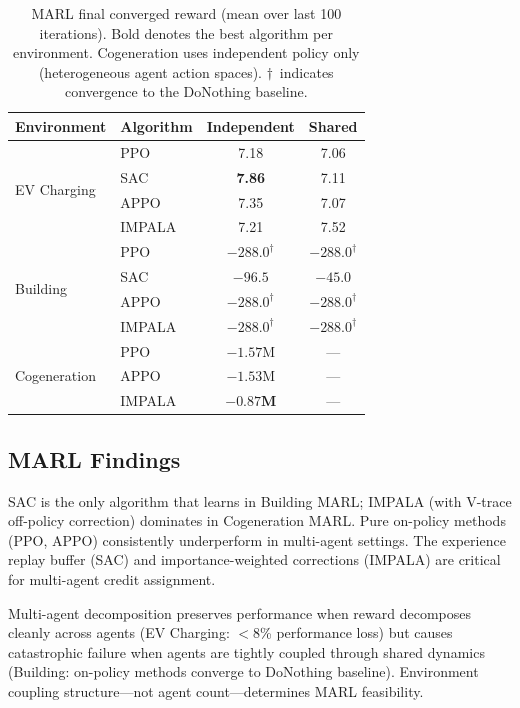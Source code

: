 \begin{table}[htbp]
\centering
\caption{MARL final converged reward (mean over last 100 iterations). Bold denotes the best algorithm per environment. Cogeneration uses independent policy only (heterogeneous agent action spaces). $\dagger$~indicates convergence to the DoNothing baseline.}
\label{tab:marl_summary}
\small
\begin{tabular}{llcc}
\toprule
\textbf{Environment} & \textbf{Algorithm} & \textbf{Independent} & \textbf{Shared} \\
\midrule
\multirow{4}{*}{EV Charging}
    & PPO    & 7.18  & 7.06 \\
    & SAC    & \textbf{7.86}  & 7.11 \\
    & APPO   & 7.35  & 7.07 \\
    & IMPALA & 7.21  & 7.52 \\
\midrule
\multirow{4}{*}{Building}
    & PPO    & $-288.0^\dagger$ & $-288.0^\dagger$ \\
    & SAC    & $-96.5$ & $\mathbf{-45.0}$ \\
    & APPO   & $-288.0^\dagger$ & $-288.0^\dagger$ \\
    & IMPALA & $-288.0^\dagger$ & $-288.0^\dagger$ \\
\midrule
\multirow{3}{*}{Cogeneration}
    & PPO    & $-1.57\text{M}$ & --- \\
    & APPO   & $-1.53\text{M}$ & --- \\
    & IMPALA & $\mathbf{-0.87\text{M}}$ & --- \\
\bottomrule
\end{tabular}
\end{table}

\subsection{MARL Findings}
\label{sec:marl_findings}

\begin{finding}
SAC is the only algorithm that learns in Building MARL; IMPALA (with V-trace off-policy correction) dominates in Cogeneration MARL. Pure on-policy methods (PPO, APPO) consistently underperform in multi-agent settings. The experience replay buffer (SAC) and importance-weighted corrections (IMPALA) are critical for multi-agent credit assignment.
\end{finding}

\begin{finding}
Multi-agent decomposition preserves performance when reward decomposes cleanly across agents (EV Charging: $<$8\% performance loss) but causes catastrophic failure when agents are tightly coupled through shared dynamics (Building: on-policy methods converge to DoNothing baseline). Environment coupling structure---not agent count---determines MARL feasibility.
\end{finding}

